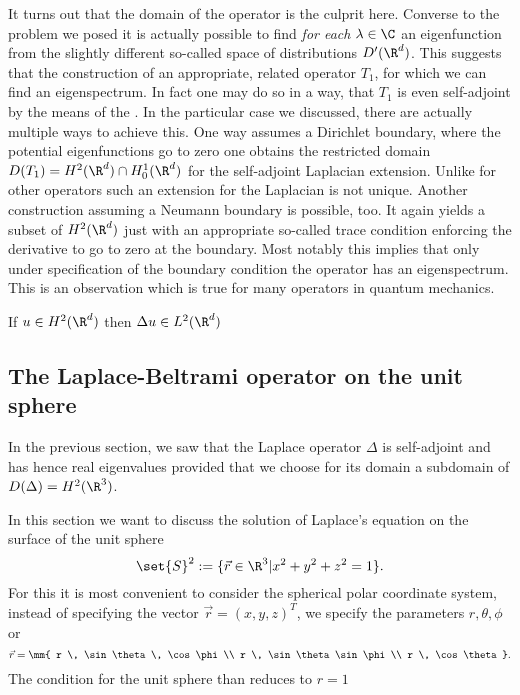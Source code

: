 It turns out that the domain of the operator is the culprit here.
Converse to the problem we posed it is actually possible
to find \emph{for each} $\lambda \in \C$ an eigenfunction from the
slightly different so-called space of distributions $D'(\R^d)$.
This suggests that the construction of an appropriate, related
operator $T_1$, for which we can find an eigenspectrum.
In fact one may do so in a way, that $T_1$ is even self-adjoint
by the means of the .
In the particular case we discussed, there are actually
multiple ways to achieve this.
One way assumes a Dirichlet boundary, where the potential
eigenfunctions go to zero
one obtains the restricted domain
$D(T_1) = H^2(\R^d) \cap H^1_0(\R^d)$
for the self-adjoint Laplacian extension.
Unlike for other operators such an extension for the Laplacian
is not unique.
Another construction assuming a Neumann boundary is possible, too.
It again yields a subset of $H^2(\R^d)$ just with an appropriate
so-called trace condition enforcing the derivative to go to zero
at the boundary.
Most notably this implies that only under specification
of the boundary condition the operator has an eigenspectrum.
This is an observation which is true for many operators in quantum mechanics.

If $u \in H^2(\R^d)$ then $\Delta u \in L^2(\R^d)$

\subsection{The Laplace-Beltrami operator on the unit sphere}
\label{sec:SpectrumLaplaceBeltrami}

In the previous section, we saw that the Laplace operator $\Delta$
is self-adjoint and has hence real eigenvalues provided that
we choose for its domain a subdomain of $D(\Delta) = H^2(\R^3)$.

In this section we want to discuss the solution of Laplace's equation
on the surface of the unit sphere
\[
	\set{S}^2 := \{ \vec{r} \in \R^3 | x^2 + y^2 + z^2 = 1 \}.
\]
For this it is most convenient to consider
the spherical polar coordinate system,
\ie instead of specifying the vector $\vec{r} = (x, y, z)^T$,
we specify the parameters $r, \theta, \phi$ or
\[ \vec{r} = \mm{ r \, \sin \theta \, \cos \phi \\ r \, \sin \theta \sin \phi \\
r \, \cos \theta }. \]
The condition for the unit sphere than reduces to $r=1$

